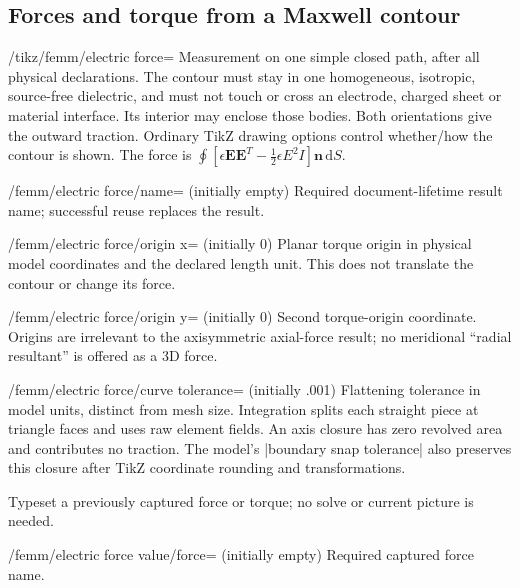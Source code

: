 \subsection{Forces and torque from a Maxwell contour}
\begin{key}{/tikz/femm/electric force=}
Measurement on one simple closed path, after all physical declarations.
The contour must stay in one homogeneous, isotropic, source-free dielectric,
and must not touch or cross an electrode, charged sheet or material interface.
Its interior may enclose those bodies. Both orientations give the outward
traction. Ordinary TikZ drawing options control whether/how the contour is shown.
The force is $\oint[\epsilon\mathbf E\mathbf E^T-
\tfrac12\epsilon E^2I]\mathbf n\,\mathrm dS$.
\end{key}
\begin{key}{/femm/electric force/name= (initially empty)}
Required document-lifetime result name; successful reuse replaces the result.
\end{key}
\begin{key}{/femm/electric force/origin x= (initially 0)}
Planar torque origin in physical model coordinates and the declared length unit.
This does not translate the contour or change its force.
\end{key}
\begin{key}{/femm/electric force/origin y= (initially 0)}
Second torque-origin coordinate. Origins are irrelevant to the axisymmetric
axial-force result; no meridional ``radial resultant'' is offered as a 3D force.
\end{key}
\begin{key}{/femm/electric force/curve tolerance= (initially .001)}
Flattening tolerance in model units, distinct from mesh size. Integration splits
each straight piece at triangle faces and uses raw element fields. An axis
closure has zero revolved area and contributes no traction. The model's
|boundary snap tolerance| also preserves this closure after TikZ coordinate
rounding and transformations.
\end{key}
\begin{command}{\femmelectricforcevalue{}}
Typeset a previously captured force or torque; no solve or current picture is needed.
\end{command}
\begin{key}{/femm/electric force value/force= (initially empty)}
Required captured force name.
\end{key}

